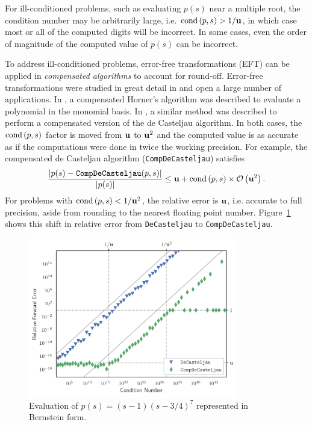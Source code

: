 For ill-conditioned problems, such as evaluating \(p(s)\) near a
multiple root, the condition number may be arbitrarily large, i.e.
\(\operatorname{cond}\left(p, s\right) > 1 / \mathbf{u}\), in
which case most or all of the computed digits will be incorrect.
In some cases, even the order of magnitude of the computed value
of \(p(s)\) can be incorrect.

To address ill-conditioned problems, error-free transformations (EFT) can
be applied in \textit{compensated algorithms} to account for round-off.
Error-free transformations were studied in great detail in \cite{Ogita2005}
and open a large number of applications.
In \cite{langlois_et_al:DSP:2006:442}, a compensated Horner's algorithm was
described to evaluate a polynomial in the monomial basis. In \cite{Jiang2010},
a similar method was described to perform a compensated version of the de
Casteljau algorithm. In both cases, the \(\operatorname{cond}\left(p, s\right)\) factor is moved
from \(\mathbf{u}\) to \(\mathbf{u}^2\) and the computed value is as accurate
as if the computations were done in twice the working precision. For example,
the compensated de Casteljau algorithm (\texttt{CompDeCasteljau}) satisfies
\begin{equation}\label{eq:de-casteljau-2-error}
  \frac{\left|p(s) - \mathtt{CompDeCasteljau}(p, s)\right|}{
    \left|p(s)\right|} \leq \mathbf{u} + \operatorname{cond}\left(p, s\right) \times
    \mathcal{O}\left(\mathbf{u}^2\right).
\end{equation}
For problems with \(\operatorname{cond}\left(p, s\right) < 1 / \mathbf{u}^2\), the relative error
is \(\mathbf{u}\), i.e. accurate to full precision, aside from rounding to the
nearest floating point number. Figure~\ref{fig:jlcs-10} shows this shift
in relative error from \texttt{DeCasteljau} to \texttt{CompDeCasteljau}.

\begin{figure}
  \includegraphics[width=0.8125\textwidth]{../images/k-compensated/jlcs10_plot.pdf}
  \centering
  \captionsetup{width=.75\linewidth}
  \caption{Evaluation of \(p(s) = (s - 1)\left(s - 3/4\right)^7\)
    represented in Bernstein form.}
  \label{fig:jlcs-10}
\end{figure}

